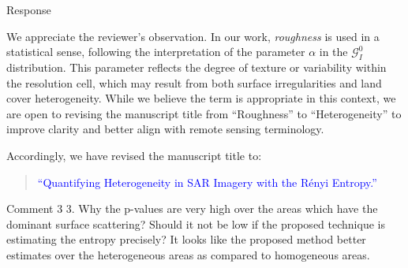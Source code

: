 \documentclass[11pt]{report}
\begin{document}
\begin{responsebox}{Response}

We appreciate the reviewer’s observation. In our work, \emph{roughness} is used in a statistical sense, following the interpretation of the parameter $\alpha$ in the $\mathcal{G}^0_I$ distribution. This parameter reflects the degree of texture or variability within the resolution cell, which may result from both surface irregularities and land cover heterogeneity. While we believe the term is appropriate in this context, we are open to revising the manuscript title from ``Roughness'' to ``Heterogeneity'' to improve clarity and better align with remote sensing terminology.

Accordingly, we have revised the manuscript title to:
\begin{quote}
	\textcolor{blue}{
	``Quantifying Heterogeneity in SAR Imagery with the Rényi Entropy.''}
\end{quote}
\end{responsebox}

\vspace{2em}
\begin{reviewbox}{Comment 3}
3. Why the p-values are very high over the areas which have the dominant surface scattering? Should it not be low if the proposed technique is estimating the entropy precisely? It looks like the proposed method better estimates over the heterogeneous areas as compared to homogeneous areas.
\end{reviewbox}
\end{document}
